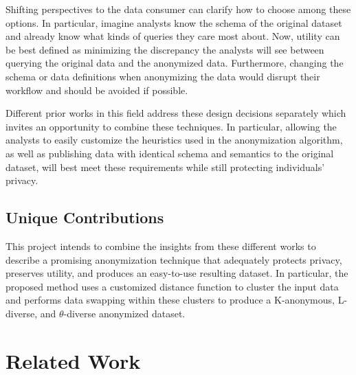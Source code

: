 Shifting perspectives to the data consumer can clarify how to choose among these options. In particular, imagine analysts know the schema of the original dataset and already know what kinds of queries they care most about. Now, utility can be best defined as minimizing the discrepancy the analysts will see between querying the original data and the anonymized data. Furthermore, changing the schema or data definitions when anonymizing the data would disrupt their workflow and should be avoided if possible.

Different prior works in this field address these design decisions separately which invites an opportunity to combine these techniques. In particular, allowing the analysts to easily customize the heuristics used in the anonymization algorithm, as well as publishing data with identical schema and semantics to the original dataset, will best meet these requirements while still protecting individuals' privacy.


\subsection{Unique Contributions}
This project intends to combine the insights from these different works to describe a promising anonymization technique that adequately protects privacy, preserves utility, and produces an easy-to-use resulting dataset. In particular, the proposed method uses a customized distance function\cite{jiaPad} to cluster the input data and performs data swapping\cite{soriaSwapping} within these clusters to produce a K-anonymous, L-diverse\cite{machanavajjhalalDiversity}, and $\theta$-diverse anonymized dataset.

\section{Related Work}
